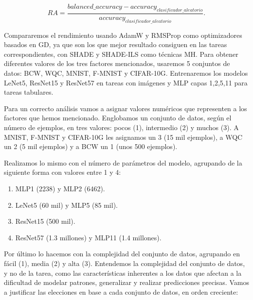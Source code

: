 $$RA = \frac{balanced\_accuracy - accuracy_{clasificador\_aleatorio}}{accuracy_{clasificador\_aleatorio}}.$$

Compararemos el rendimiento usando AdamW y RMSProp como optimizadores basados en GD, ya que son los que mejor resultado consiguen en las tareas correspondientes, con SHADE y SHADE-ILS como técnicas MH. Para obtener diferentes valores de los tres factores mencionados, usaremos 5 conjuntos de datos: BCW,  WQC, MNIST, F-MNIST y CIFAR-10G. Entrenaremos los modelos LeNet5, ResNet15 y ResNet57 en tareas con imágenes y MLP capas 1,2,5,11 para tareas tabulares. 


Para un correcto análisis vamos a asignar valores numéricos que representen a los factores que hemos mencionado. Englobamos un conjunto de datos, según el número de ejemplos, en tres valores: pocos (1), intermedio (2) y muchos (3). A MNIST, F-MNIST y CIFAR-10G les asignamos un 3 (15 mil ejemplos), a WQC un 2 (5 mil ejemplos) y a BCW un 1 (unos 500 ejemplos). 

 Realizamos lo mismo con el número de parámetros del modelo, agrupando de la siguiente forma con valores entre 1 y 4:
 
 \begin{enumerate}
 
 \item MLP1 (2238) y MLP2 (6462).
 
 \item LeNet5 (60 mil) y MLP5 (85 mil).
 
 \item ResNet15 (500 mil).
 
 \item ResNet57 (1.3 millones) y MLP11 (1.4 millones).
 \end{enumerate}


Por último lo hacemos con la complejidad del conjunto de datos, agrupando en fácil (1), media (2) y alta (3). Entendemos la complejidad del conjunto de datos, y no de la tarea, como las características inherentes a los datos que afectan a la dificultad de modelar patrones, generalizar y realizar predicciones precisas. Vamos a justificar las elecciones en base a cada conjunto de datos, en orden creciente:

